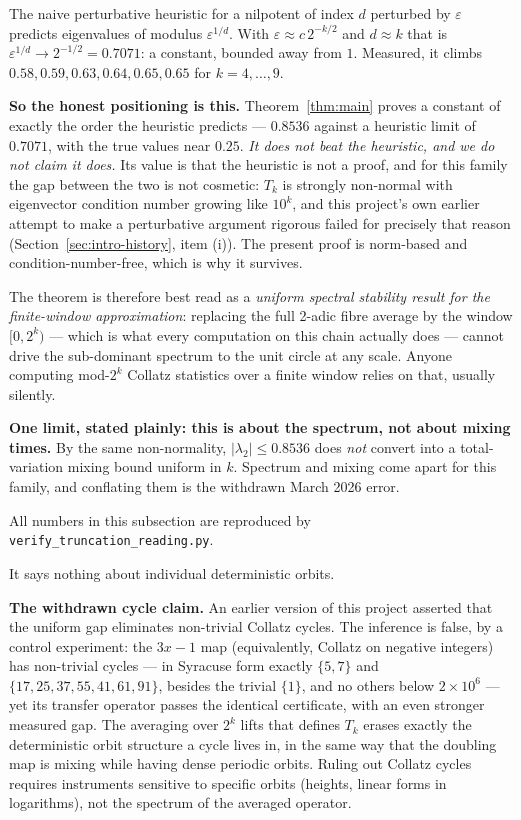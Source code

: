 \documentclass[12pt,a4paper]{article}
\begin{document}
The naive perturbative heuristic for a nilpotent of index $d$ perturbed by $\varepsilon$ predicts
eigenvalues of modulus $\varepsilon^{1/d}$. With $\varepsilon \approx c\,2^{-k/2}$ and
$d \approx k$ that is $\varepsilon^{1/d} \to 2^{-1/2} = 0.7071$: a constant, bounded away from
$1$. Measured, it climbs $0.58, 0.59, 0.63, 0.64, 0.65, 0.65$ for $k = 4,\dots,9$.

\textbf{So the honest positioning is this.} Theorem~\ref{thm:main} proves a constant of exactly
the order the heuristic predicts --- $0.8536$ against a heuristic limit of $0.7071$, with the
true values near $0.25$. \emph{It does not beat the heuristic, and we do not claim it does.} Its
value is that the heuristic is not a proof, and for this family the gap between the two is not
cosmetic: $T_k$ is strongly non-normal with eigenvector condition number growing like $10^k$, and
this project's own earlier attempt to make a perturbative argument rigorous failed for precisely
that reason (Section~\ref{sec:intro-history}, item (i)). The present proof is norm-based and
condition-number-free, which is why it survives.

The theorem is therefore best read as a \emph{uniform spectral stability result for the
finite-window approximation}: replacing the full 2-adic fibre average by the window $[0,2^k)$ ---
which is what every computation on this chain actually does --- cannot drive the sub-dominant
spectrum to the unit circle at any scale. Anyone computing mod-$2^k$ Collatz statistics over a
finite window relies on that, usually silently.

\textbf{One limit, stated plainly: this is about the spectrum, not about mixing times.} By the
same non-normality, $|\lambda_2| \le 0.8536$ does \emph{not} convert into a total-variation
mixing bound uniform in $k$. Spectrum and mixing come apart for this family, and conflating them
is the withdrawn March 2026 error.

All numbers in this subsection are reproduced by \texttt{verify\_truncation\_reading.py}.

It says nothing about individual deterministic orbits.

\textbf{The withdrawn cycle claim.} An earlier version of this project asserted that the uniform
gap eliminates non-trivial Collatz cycles. The inference is false, by a control experiment: the
$3x - 1$ map (equivalently, Collatz on negative integers) has non-trivial cycles --- in Syracuse
form exactly $\{5, 7\}$ and $\{17, 25, 37, 55, 41, 61, 91\}$, besides the trivial $\{1\}$, and no
others below $2 \times 10^6$ --- yet
its transfer operator passes the identical certificate, with an even stronger measured gap. The
averaging over $2^k$ lifts that defines $T_k$ erases exactly the deterministic orbit structure a
cycle lives in, in the same way that the doubling map is mixing while having dense periodic
orbits. Ruling out Collatz cycles requires instruments sensitive to specific orbits (heights,
linear forms in logarithms), not the spectrum of the averaged operator.
\end{document}
